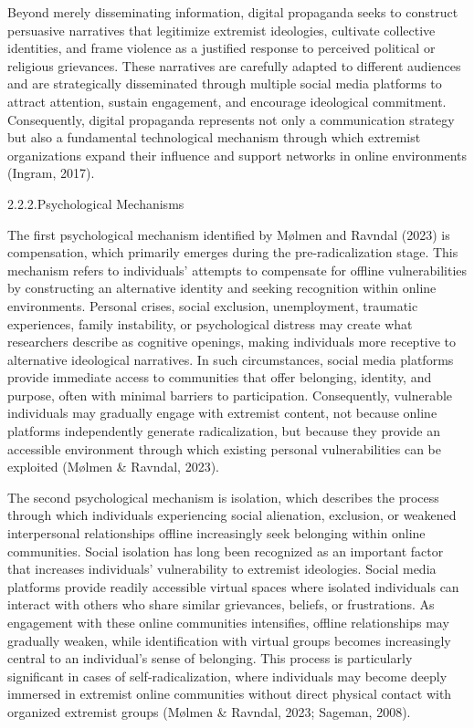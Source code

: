 \documentclass[10pt]{NSP1}
\begin{document}
Beyond merely disseminating information, digital propaganda seeks to construct persuasive narratives that legitimize extremist ideologies, cultivate collective identities, and frame violence as a justified response to perceived political or religious grievances. These narratives are carefully adapted to different audiences and are strategically disseminated through multiple social media platforms to attract attention, sustain engagement, and encourage ideological commitment. Consequently, digital propaganda represents not only a communication strategy but also a fundamental technological mechanism through which extremist organizations expand their influence and support networks in online environments (Ingram, 2017).

2.2.2.Psychological Mechanisms

\par\medskip{}\smallskip

The first psychological mechanism identified by Mølmen and Ravndal (2023) is compensation, which primarily emerges during the pre-radicalization stage. This mechanism refers to individuals' attempts to compensate for offline vulnerabilities by constructing an alternative identity and seeking recognition within online environments. Personal crises, social exclusion, unemployment, traumatic experiences, family instability, or psychological distress may create what researchers describe as cognitive openings, making individuals more receptive to alternative ideological narratives. In such circumstances, social media platforms provide immediate access to communities that offer belonging, identity, and purpose, often with minimal barriers to participation. Consequently, vulnerable individuals may gradually engage with extremist content, not because online platforms independently generate radicalization, but because they provide an accessible environment through which existing personal vulnerabilities can be exploited (Mølmen \& Ravndal, 2023).

\par\medskip{}\smallskip

The second psychological mechanism is isolation, which describes the process through which individuals experiencing social alienation, exclusion, or weakened interpersonal relationships offline increasingly seek belonging within online communities. Social isolation has long been recognized as an important factor that increases individuals' vulnerability to extremist ideologies. Social media platforms provide readily accessible virtual spaces where isolated individuals can interact with others who share similar grievances, beliefs, or frustrations. As engagement with these online communities intensifies, offline relationships may gradually weaken, while identification with virtual groups becomes increasingly central to an individual's sense of belonging. This process is particularly significant in cases of self-radicalization, where individuals may become deeply immersed in extremist online communities without direct physical contact with organized extremist groups (Mølmen \& Ravndal, 2023; Sageman, 2008).
\end{document}
